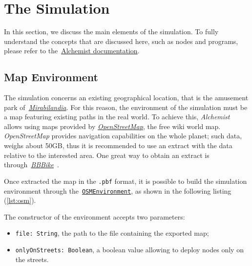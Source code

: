 \section{The Simulation}\label{sec:the-simulation}

In this section, we discuss the main elements of the simulation.
To fully understand the concepts that are discussed here, such as nodes and programs, please refer to the~\href{https://alchemistsimulator.github.io/}{Alchemist documentation}.

\subsection{Map Environment}\label{subsec:map-environment}
The simulation concerns an existing geographical location, that is the amusement park of~\href{https://www.mirabilandia.it/}{\textit{Mirabilandia}}.
For this reason, the environment of the simulation must be a map featuring existing paths in the real world.
To achieve this, \textit{Alchemist} allows using maps provided by \href{https://www.openstreetmap.org/}{\textit{OpenStreetMap}}, the free wiki world map. \textit{OpenStreetMap} provides navigation capabilities on the whole planet;
such data, weighs about 50GB, thus it is recommended to use an extract with the data relative to the interested area.
One great way to obtain an extract is through~\href{https://extract.bbbike.org/}{\textit{BBBike}}~\cite{Pianini_2013}.

Once extracted the map in the \texttt{.pbf} format, it is possible to build the simulation environment through the~\href{https://alchemistsimulator.github.io/reference/kdoc/alchemist/it.unibo.alchemist.model.implementations.environments/-o-s-m-environment/}{\texttt{OSMEnvironment}}, as shown in the following listing (\ref{lst:osm}).



\noindent
The constructor of the environment accepts two parameters:
\begin{itemize}
    \item \texttt{file: String}, the path to the file containing the exported map;
    \item \texttt{onlyOnStreets: Boolean}, a boolean value allowing to deploy nodes only on the streets.
\end{itemize}

